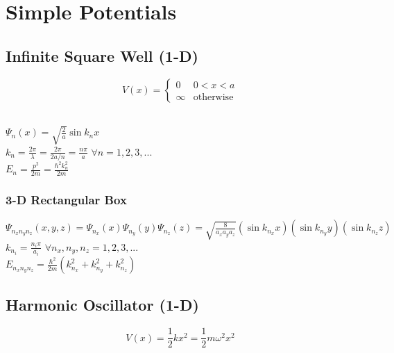 \documentclass[12pt]{article}
\begin{document}
\newpage
\section{Simple Potentials}

\subsection{Infinite Square Well (1-D)}
\boldmath \[ V(x) = \begin{cases}
    0 & 0<x<a \\
    \infty & \text{otherwise}
\end{cases} \] \unboldmath 

\hfill \break \\
\( \displaystyle \Psi_n(x) = \sqrt{\frac{2}{a}} \sin{k_nx} \) \\[20pt]
\( \displaystyle k_n = \frac{2 \pi}{\lambda} = \frac{2 \pi}{2a/n} = \frac{n \pi}{a}\)
    \indent \( \forall n=1, 2, 3, ...\)         
    \indent \indent {} 
     \\[20pt]
\( \displaystyle E_n = \frac{p^2}{2m} = \frac{\hbar^2 k_n^2}{2m}\)

\hfill \break
\subsubsection{3-D Rectangular Box}
\( \displaystyle \Psi_{n_x n_y n_z}(x,y,z) = \Psi_{n_x}(x) \Psi_{n_y}(y) \Psi_{n_z}(z) 
    = \sqrt{\frac{8}{a_x a_y a_z}} (\sin{k_{n_x} x}) (\sin{k_{n_y} y}) (\sin{k_{n_z} z}) \) \\[20pt]
\( \displaystyle k_{n_i} = \frac{n_i \pi}{a_i}\)
    \indent \( \forall n_x, n_y, n_z = 1, 2, 3, ...\) \\[20pt]
\( \displaystyle E_{n_x n_y n_z} = \frac{\hbar^2}{2m} (k_{n_x}^2 + k_{n_y}^2 + k_{n_z}^2) \) 

\newpage
\subsection{Harmonic Oscillator (1-D)}
\boldmath \[ V(x) = \frac{1}{2} k x^2 = \frac{1}{2} m \omega^2 x^2 \] \unboldmath
\end{document}
